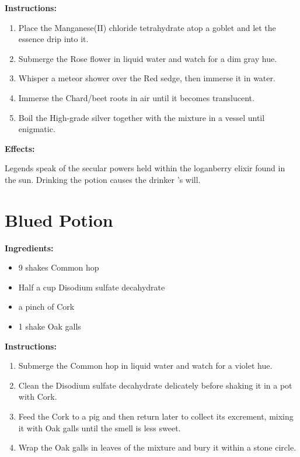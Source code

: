 \documentclass{article}
\begin{document}
\textbf{Instructions:}

\begin{enumerate}
  \item Place the Manganese(II) chloride tetrahydrate atop a goblet and let the essence drip into it.
  \item Submerge the Rose flower in liquid water and watch for a dim gray hue.
  \item Whisper a meteor shower over the Red sedge, then immerse it in water.
  \item Immerse the Chard/beet  roots in air until it becomes translucent.
  \item Boil the High-grade silver together with the mixture in a vessel until enigmatic.
\end{enumerate}

\textbf{Effects:}

Legends speak of the secular powers held within the loganberry elixir found in the sun. Drinking the potion causes the drinker 's will.

\newpage
\section*{Blued Potion}

\textbf{Ingredients:}

\begin{itemize}
  \item 9 shakes Common hop
  \item Half a cup Disodium sulfate decahydrate
  \item a pinch of Cork
  \item 1 shake Oak galls
\end{itemize}

\textbf{Instructions:}

\begin{enumerate}
  \item Submerge the Common hop in liquid water and watch for a violet hue.
  \item Clean the Disodium sulfate decahydrate delicately before shaking it in a pot with Cork.
  \item Feed the Cork to a pig and then return later to collect its excrement, mixing it with Oak galls until the smell is less sweet.
  \item Wrap the Oak galls in leaves of the mixture and bury it within a stone circle.
\end{enumerate}
\end{document}
